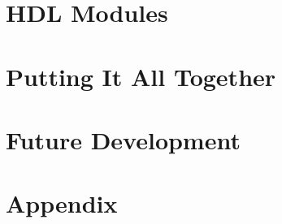 \documentclass[12pt]{article}
\begin{document}
\section{HDL Modules}

\section{Putting It All Together}

\section{Future Development}

\section{Appendix}



\end{document}
